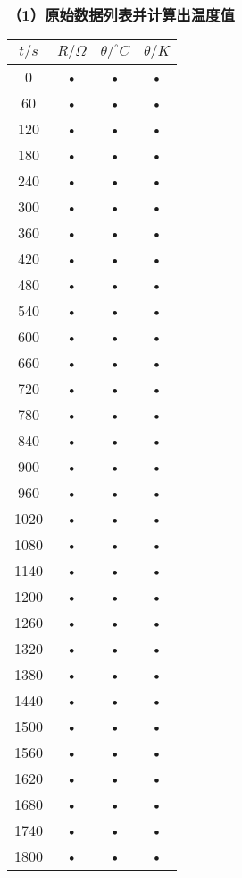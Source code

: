\documentclass[11pt,a4paper,oneside]{article}
\begin{document}
\subsubsection{（1）原始数据列表并计算出温度值}
\begin{tabular}{|c|c|c|c|}
\hline 
$t/s$ & $R/\Omega $ & $\theta /^{\circ}C$ & $\theta /K$ \\ 
\hline 
0 & • & • & • \\ 
\hline 
60 & • & • & • \\ 
\hline 
120 & • & • & • \\ 
\hline 
180 & • & • & • \\ 
\hline 
240 & • & • & • \\ 
\hline 
300 & • & • & • \\ 
\hline 
360 & • & • & • \\ 
\hline 
420 & • & • & • \\ 
\hline 
480 & • & • & • \\ 
\hline 
540 & • & • & • \\ 
\hline 
600 & • & • & • \\ 
\hline 
660 & • & • & • \\ 
\hline 
720 & • & • & • \\ 
\hline 
780 & • & • & • \\ 
\hline 
840 & • & • & • \\ 
\hline 
900 & • & • & • \\ 
\hline 
960 & • & • & • \\ 
\hline 
1020 & • & • & • \\ 
\hline 
1080 & • & • & • \\ 
\hline 
1140 & • & • & • \\ 
\hline 
1200 & • & • & • \\ 
\hline 
1260 & • & • & • \\ 
\hline 
1320 & • & • & • \\ 
\hline 
1380 & • & • & • \\ 
\hline 
1440 & • & • & • \\ 
\hline 
1500 & • & • & • \\ 
\hline 
1560 & • & • & • \\ 
\hline 
1620 & • & • & • \\ 
\hline 
1680 & • & • & • \\ 
\hline 
1740 & • & • & • \\ 
\hline 
1800 & • & • & • \\ 
\hline 
\end{tabular} 
\end{document}
